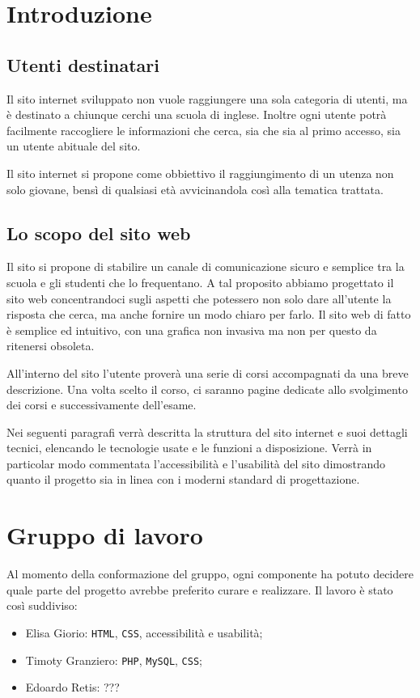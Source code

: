 \documentclass[12pt, a4paper]{article}
\begin{document}
\section{Introduzione}

\subsection{Utenti destinatari}
Il sito internet sviluppato non vuole raggiungere una sola categoria di utenti, ma è destinato a chiunque cerchi una scuola di inglese.  Inoltre ogni utente potrà facilmente raccogliere le informazioni che cerca, sia che sia al primo accesso, sia un utente abituale del sito.\par
Il sito internet si propone come obbiettivo il raggiungimento di un utenza non solo giovane, bensì di qualsiasi età avvicinandola così alla tematica trattata.

\subsection{Lo scopo del sito web}
Il sito si propone di stabilire un canale di comunicazione sicuro e semplice tra la scuola e gli studenti che lo frequentano. A tal proposito abbiamo progettato il sito web concentrandoci sugli aspetti che potessero non solo dare all’utente la risposta che cerca, ma anche fornire un modo chiaro per farlo. Il sito web di fatto è semplice ed intuitivo, con una grafica non invasiva ma non per questo da ritenersi obsoleta.\par
\smallskip
All’interno del sito l’utente proverà una serie di corsi accompagnati da una breve descrizione. Una volta scelto il corso, ci saranno pagine dedicate allo svolgimento dei corsi e successivamente dell’esame.\par
\smallskip
Nei seguenti paragrafi verrà descritta la struttura del sito internet e suoi dettagli tecnici, elencando le tecnologie usate e le funzioni a disposizione. Verrà in particolar modo commentata l’accessibilità e l’usabilità del sito dimostrando quanto il progetto sia in linea con i moderni standard di progettazione.

\section{Gruppo di lavoro}
Al momento della conformazione del gruppo, ogni componente ha potuto decidere quale parte del progetto avrebbe preferito curare e realizzare. 
Il lavoro è stato così suddiviso:
\begin{itemize}
	\item Elisa Giorio: \texttt{HTML}, \texttt{CSS}, accessibilità e usabilità;
	\item Timoty Granziero: \texttt{PHP}, \texttt{MySQL}, \texttt{CSS};
	\item Edoardo Retis: ???
\end{itemize}
\end{document}
